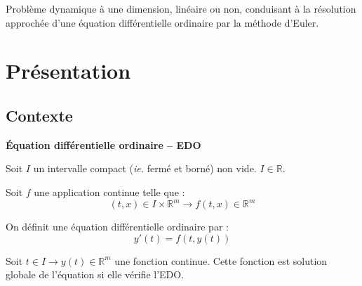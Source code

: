 \documentclass[10pt]{article}
\begin{document}

\begin{minipage}[c]{.2\linewidth}
\begin{center}
\end{center}
\end{minipage}\hfill
\begin{minipage}[c]{.33\linewidth}
\begin{center}
\end{center}
\end{minipage}\hfill
\begin{minipage}[c]{.45\linewidth}
\begin{center}
\end{center}
\end{minipage}
\vspace{.5cm}

\begin{savoir}
Problème dynamique à une dimension,  linéaire ou non, conduisant à la résolution approchée d’une équation différentielle ordinaire par la méthode d’Euler.
\end{savoir}



\setlength{\parskip}{0ex plus 0.2ex minus 0ex}
 \renewcommand{\contentsname}{}
 \renewcommand{\baselinestretch}{1}

\tableofcontents

 \renewcommand{\baselinestretch}{1.2}
\setlength{\parskip}{2ex plus 0.5ex minus 0.2ex}





\section{Présentation}

\subsection{Contexte}

\begin{defi}
\textbf{Équation différentielle ordinaire -- EDO}

Soit $I$ un intervalle compact (\textit{ie.} fermé et borné) non vide. $I\in\mathbb{R}$. 

Soit $f$ une application continue telle que : 
$$
(t,x)\in I \times \mathbb{R}^m \rightarrow f(t,x)\in \mathbb{R}^m 
$$

On définit une équation différentielle ordinaire par :
$$
y'(t)=f\left( t,y(t)\right)
$$

Soit $t\in I \rightarrow y(t) \in \mathbb{R}^m$ une fonction continue. Cette fonction est solution globale de l'équation si elle vérifie l'EDO. 
\end{defi}
\end{document}
